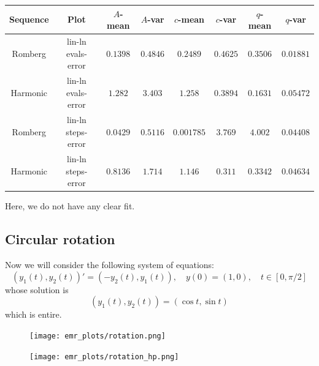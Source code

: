 \begin{table}[H]
    \centering
    \small
     \begin{tabular}{c|c||c|c|c|c|c|c}
Sequence & Plot & \(A\)-mean & \(A\)-var & \(c\)-mean & \(c\)-var & \(q\)-mean & \(q\)-var\\\hline
Romberg & lin-ln evals-error & \(0.1398\) & \(0.4846\) & \(0.2489\) & \(0.4625\) & \(0.3506\) & \(0.01881\) \\
Harmonic & lin-ln evals-error & \(1.282\) & \(3.403\) & \(1.258\) & \(0.3894\) & \(0.1631\) & \(0.05472\) \\
Romberg & lin-ln steps-error & \(0.0429\) & \(0.5116\) & \(0.001785\) & \(3.769\) & \(4.002\) & \(0.04408\) \\
Harmonic & lin-ln steps-error & \(0.8136\) & \(1.714\) & \(1.146\) & \(0.311\) & \(0.3342\) & \(0.04634\) \\
    \end{tabular}
    \label{tab:my_label}
\end{table}

Here, we do not have any clear fit.

\subsection{Circular rotation}

Now we will consider the following system of equations:
\begin{equation}\label{48}
(y_1(t),y_2(t))' = (-y_2(t), y_1(t)), \quad y(0) = (1,0), \quad t\in [0,\pi /2]
\end{equation}
whose solution is 
\[
(y_1(t),y_2(t)) = (\cos t, \sin t)
\]
which is entire.

\begin{figure}[H]
\centering
\begin{minipage}{0.45\textwidth}
\centering
\texttt{[image: emr\_plots/rotation.png]}
\end{minipage}
\begin{minipage}{0.45\textwidth}
\centering
\texttt{[image: emr\_plots/rotation\_hp.png]}
\end{minipage}
\end{figure}

